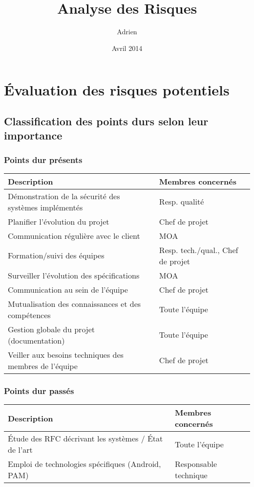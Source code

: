 \documentclass{../../res/univ-projet}
\title{Analyse des Risques}
\author{Adrien \bsc{Smondack}}
\date{Avril 2014}
\begin{document}
\maketitle

\section{Évaluation des risques potentiels}
\subsection{Classification des points durs selon leur importance}
\subsubsection{Points dur présents}
	\begin{tabular}{| p{9cm} | p{5cm} |} 
		\hline
		\cellcolor{gray} Description & \cellcolor{gray} Membres concernés \\ \hline
		Démonstration de la sécurité des systèmes implémentés & Resp. qualité \\ \hline
		Planifier l'évolution du projet & Chef de projet \\ \hline
		Communication régulière avec le client & MOA \\ \hline
		Formation/suivi des équipes & Resp. tech./qual., Chef de projet \\ \hline
		Surveiller l'évolution des spécifications & MOA \\ \hline
		Communication au sein de l'équipe & Chef de projet \\ \hline
		Mutualisation des connaissances et des compétences & Toute l'équipe \\ \hline
		Gestion globale du projet (documentation) & Toute l'équipe\\ \hline
		Veiller aux besoins techniques des membres de l'équipe & Chef de projet \\ \hline
	\end{tabular}

\subsubsection{Points dur passés}
	\begin{tabular}{| p{9cm} | p{5cm} |} 
		\hline
		\cellcolor{gray} Description & \cellcolor{gray} Membres concernés \\ \hline
		Étude des RFC décrivant les systèmes / \'Etat de l'art & Toute l'équipe \\ \hline
		Emploi de technologies spécifiques (Android, PAM) & Responsable technique \\ \hline
	\end{tabular}
	
\end{document}
